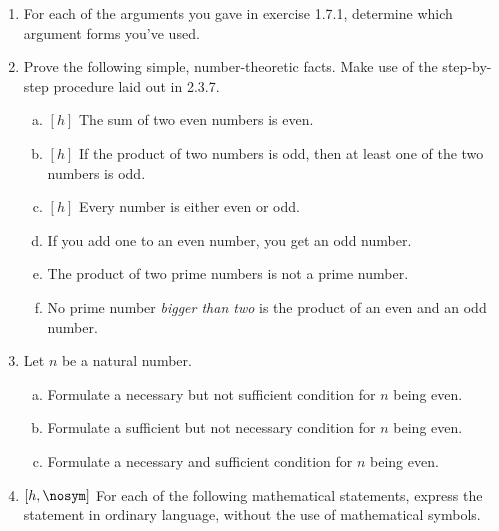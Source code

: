 \begin{enumerate}[{\thesection}.1]

	\item For each of the arguments you gave in exercise 1.7.1, determine which argument forms you've used.
		
	\item Prove the following simple, number-theoretic facts. Make use of the step-by-step procedure laid out in 2.3.7.
	
		\begin{enumerate}[(a)]

			\item $[h]$ The sum of two even numbers is even.
			
			\item $[h]$ If the product of two numbers is odd, then at least one of the two numbers is odd. 
			
			\item $[h]$ Every number is either even or odd.
			
			\item If you add one to an even number, you get an odd number.

			\item The product of two prime numbers is not a prime number.
			
			\item No prime number \emph{bigger than two} is the product of an even and an odd number.

		\end{enumerate}
		
	\item Let $n$ be a natural number. 
	
			\begin{enumerate}[(a)]

				\item Formulate a necessary but not sufficient condition for $n$ being even.

				\item Formulate a sufficient but not necessary condition for $n$ being even.
				
				\item Formulate a necessary and sufficient condition for $n$ being even.

			\end{enumerate}
	
	\item $[h,\nosym]$ For each of the following mathematical statements, express the statement in ordinary language, without the use of mathematical symbols.
	

\end{enumerate}
